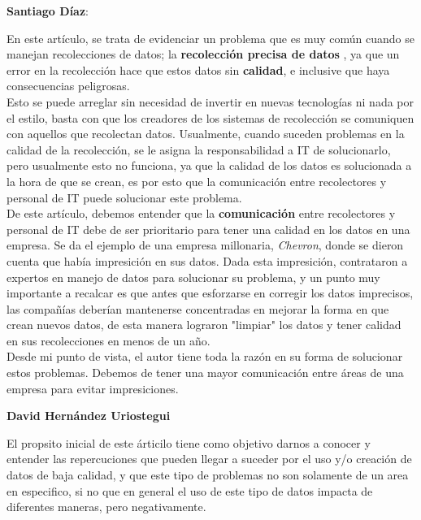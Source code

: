 \documentclass{article}
\begin{document}
\vspace{4mm}
\begin{center}
    \textbf{Santiago Díaz}:
\end{center}
En este artículo, se trata de evidenciar un problema que es muy común cuando se manejan recolecciones de datos; la \textbf{recolección precisa de datos}
, ya que un error en la recolección hace que estos datos sin \textbf{calidad}, e inclusive que haya consecuencias peligrosas.\\
Esto se puede arreglar sin necesidad de invertir en nuevas tecnologías ni nada por el estilo, basta con que los creadores de los sistemas de 
recolección se comuniquen con aquellos que recolectan datos. Usualmente, cuando suceden problemas en la calidad de la recolección, se le asigna 
la responsabilidad a IT de solucionarlo, pero usualmente esto no funciona, ya que la calidad de los datos es solucionada a la hora de que se crean, 
es por esto que la comunicación entre recolectores y personal de IT puede solucionar este problema.\\
De este artículo, debemos entender que la \textbf{comunicación} entre recolectores y personal de IT debe de ser prioritario para tener una calidad 
en los datos en una empresa. Se da el ejemplo de una empresa millonaria, \textit{Chevron}, donde se dieron cuenta que había impresición en sus datos. 
Dada esta impresición, contrataron a expertos en manejo de datos para solucionar su problema, y un punto muy importante a recalcar es que antes que
esforzarse en corregir los datos imprecisos, las compañías deberían mantenerse concentradas en mejorar la forma en que crean nuevos datos, de esta 
manera lograron "limpiar" los datos y tener calidad en sus recolecciones en menos de un año.\\
Desde mi punto de vista, el autor tiene toda la razón en su forma de solucionar estos problemas. Debemos de tener una mayor comunicación entre áreas 
de una empresa para evitar impresiciones.


\vspace{4mm}
\begin{center}
\textbf{David Hernández Uriostegui}
\end{center}
El propsito inicial de este árticilo tiene como objetivo darnos a conocer y entender las repercuciones que pueden llegar a suceder por el uso y/o 
creación de datos de baja calidad, y que este tipo de problemas no son solamente de un area en especifico, si no que en general el uso de este 
tipo  de datos impacta de diferentes maneras, pero negativamente.
\end{document}
